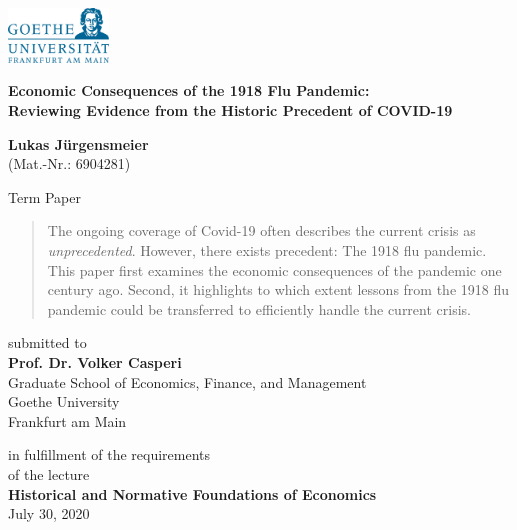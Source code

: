 \documentclass[12pt,a4paper]{article}
\begin{document}
\begin{center}
 \includegraphics[width=0.2\textwidth]{external/GU-Logo-blau-CMYK.eps} \vspace{1.5cm}
  
{\large{\bf Economic Consequences of the 1918 Flu Pandemic:\\
		Reviewing Evidence from the Historic Precedent of COVID-19}}

\textbf{Lukas J\"urgensmeier} \\
{\footnotesize (Mat.-Nr.: 6904281)}

  Term Paper \\\vspace{1.5cm}
  
  \begin{abstract}
  	The ongoing coverage of Covid-19 often describes the current crisis as \textit{unprecedented}.
  	However, there exists precedent: The 1918 flu pandemic.
  	This paper first examines the economic consequences of the pandemic one century ago.
  	Second, it highlights to which extent lessons from the 1918 flu pandemic could be transferred to efficiently handle the current crisis.
  \end{abstract} \vspace{1.5cm}
  
  submitted to \\\vspace{0.5cm}
  \textbf{Prof. Dr. Volker Casperi} \\
  Graduate School of Economics, Finance, and Management \\
  Goethe University \\
  Frankfurt am Main \vspace{1.5cm}
  
  in fulfillment of the requirements \\
  of the lecture \\\vspace{0.5cm}
  \textbf{Historical and Normative Foundations of Economics} \\\vspace{0.5cm}
  July 30, 2020
  
\end{center}


\pagebreak
\pagestyle{plain}
\tableofcontents
\pagebreak
\listoffigures
\listoftables
\newpage
{}
 
\end{document}
